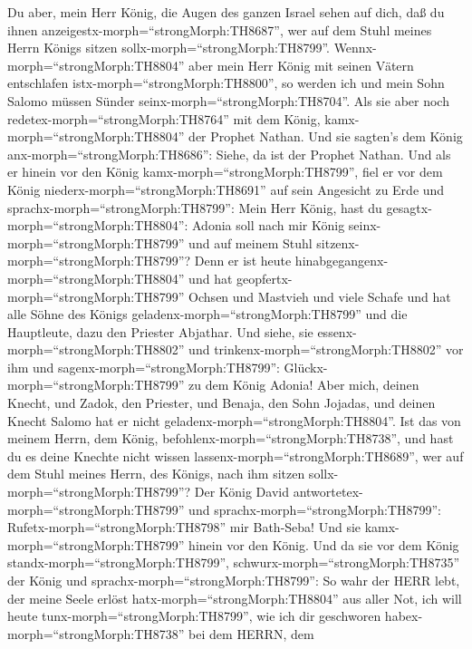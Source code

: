 Du aber, mein Herr König, die Augen des ganzen Israel sehen auf dich,
daß du ihnen anzeigestx-morph=``strongMorph:TH8687'', wer auf dem Stuhl
meines Herrn Königs sitzen sollx-morph=``strongMorph:TH8799''.
 Wennx-morph=``strongMorph:TH8804'' aber mein Herr König
mit seinen Vätern entschlafen istx-morph=``strongMorph:TH8800'', so
werden ich und mein Sohn Salomo müssen Sünder
seinx-morph=``strongMorph:TH8704''.  Als sie aber noch
redetex-morph=``strongMorph:TH8764'' mit dem König,
kamx-morph=``strongMorph:TH8804'' der Prophet Nathan.  Und
sie sagten's dem König anx-morph=``strongMorph:TH8686'': Siehe, da ist
der Prophet Nathan. Und als er hinein vor den König
kamx-morph=``strongMorph:TH8799'', fiel er vor dem König
niederx-morph=``strongMorph:TH8691'' auf sein Angesicht zu Erde
 und sprachx-morph=``strongMorph:TH8799'': Mein Herr König,
hast du gesagtx-morph=``strongMorph:TH8804'': Adonia soll nach mir König
seinx-morph=``strongMorph:TH8799'' und auf meinem Stuhl
sitzenx-morph=``strongMorph:TH8799''?  Denn er ist heute
hinabgegangenx-morph=``strongMorph:TH8804'' und hat
geopfertx-morph=``strongMorph:TH8799'' Ochsen und Mastvieh und viele
Schafe und hat alle Söhne des Königs
geladenx-morph=``strongMorph:TH8799'' und die Hauptleute, dazu den
Priester Abjathar. Und siehe, sie essenx-morph=``strongMorph:TH8802''
und trinkenx-morph=``strongMorph:TH8802'' vor ihm und
sagenx-morph=``strongMorph:TH8799'': Glückx-morph=``strongMorph:TH8799''
zu dem König Adonia!  Aber mich, deinen Knecht, und Zadok,
den Priester, und Benaja, den Sohn Jojadas, und deinen Knecht Salomo hat
er nicht geladenx-morph=``strongMorph:TH8804''.  Ist das
von meinem Herrn, dem König, befohlenx-morph=``strongMorph:TH8738'', und
hast du es deine Knechte nicht wissen
lassenx-morph=``strongMorph:TH8689'', wer auf dem Stuhl meines Herrn,
des Königs, nach ihm sitzen sollx-morph=``strongMorph:TH8799''?
 Der König David antwortetex-morph=``strongMorph:TH8799''
und sprachx-morph=``strongMorph:TH8799'':
Rufetx-morph=``strongMorph:TH8798'' mir Bath-Seba! Und sie
kamx-morph=``strongMorph:TH8799'' hinein vor den König. Und da sie vor
dem König standx-morph=``strongMorph:TH8799'', 
schwurx-morph=``strongMorph:TH8735'' der König und
sprachx-morph=``strongMorph:TH8799'': So wahr der HERR lebt, der meine
Seele erlöst hatx-morph=``strongMorph:TH8804'' aus aller Not,
 ich will heute tunx-morph=``strongMorph:TH8799'', wie ich
dir geschworen habex-morph=``strongMorph:TH8738'' bei dem HERRN, dem
